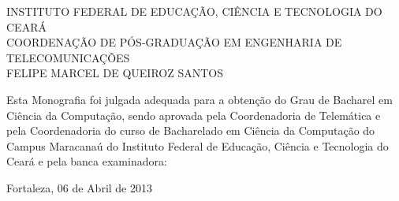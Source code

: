 \begin{folhadeaprovacao}
\setlength{\ABNTsignthickness}{0.2pt}
\setlength{\ABNTsignskip}{1.7cm}

\begin{center}

            {INSTITUTO FEDERAL DE EDUCAÇÃO, CIÊNCIA E TECNOLOGIA DO CEARÁ} \\
            {COORDENAÇÃO DE PÓS-GRADUAÇÃO EM ENGENHARIA DE TELECOMUNICAÇÕES}  \\

    \vspace{1.5cm}
                                    {FELIPE MARCEL DE QUEIROZ SANTOS}\\
    \bfseries{}
\end{center}

Esta Monografia foi julgada adequada para a obten\c{c}\~{a}o do Grau de Bacharel em Ciência da Computação, sendo aprovada pela Coordenadoria de Telemática e pela Coordenadoria do curso de Bacharelado em Ciência da Computação do Campus Maracanaú do Instituto Federal de Educação, Ciência e Tecnologia do Ceará e pela banca examinadora:

    \vspace{0.15cm}
    \vspace{0.15cm}%

    \begin{center}
        Fortaleza, 06 de Abril de 2013
    \end{center}
\end{folhadeaprovacao}